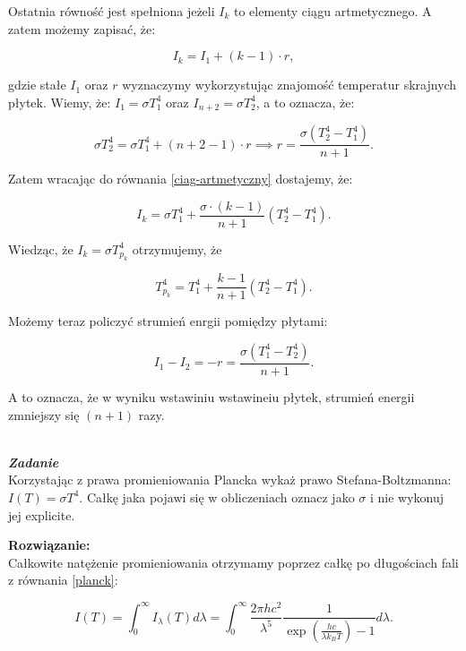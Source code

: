 \documentclass[11pt,a4paper]{article}
\newcounter{zadanie}\newcommand{\zadanie}[1][]{\addtocounter{zadanie}{1} ~\\  {\bf \emph{Zadanie \arabic{zadanie} #1 }} \\}
\begin{document}
Ostatnia równość jest spełniona jeżeli $I_{k}$ to elementy ciągu artmetycznego. A zatem możemy zapisać, że:

\begin{equation}
\label{ciag-artmetyczny}
I_{k} = I_{1} + (k-1) \cdot r,
\end{equation}

gdzie stałe $I_1$ oraz $r$ wyznaczymy wykorzystując znajomość temperatur skrajnych płytek. Wiemy, że: $I_1 = \sigma T_{1}^4$ oraz $I_{n+2} = \sigma T_{2}^{4}$, a to oznacza, że:

\begin{equation}
\sigma T_{2}^{4} = \sigma T^{4}_{1} + (n+2-1) \cdot r \implies r = \frac{\sigma (T_{2}^{4} - T_{1}^{4})}{n+1}.
\end{equation}

Zatem wracając do równania \eqref{ciag-artmetyczny} dostajemy, że:

\begin{equation}
I_{k} = \sigma T^{4}_{1} + \frac{\sigma \cdot (k-1)}{n+1}(T_{2}^{4}-T_{1}^{4}).
\end{equation}

Wiedząc, że $I_{k} = \sigma T_{p_{k}}^{4}$ otrzymujemy, że

\begin{equation}
T_{p_{k}}^{4} = T_{1}^{4} + \frac{k-1}{n+1}(T_{2}^{4}-T_{1}^{4}). 
\end{equation}

Możemy teraz policzyć strumień enrgii pomiędzy płytami:

\begin{equation}
I_{1} - I_{2} = -r = \frac{\sigma(T_{1}^{4}-T_{2}^{4})}{n+1}.
\end{equation}

A to oznacza, że w wyniku wstawiniu wstawineiu płytek, strumień energii zmniejszy się $(n+1)$ razy.

\newpage

\zadanie
Korzystając z prawa promieniowania Plancka wykaż prawo Stefana-Boltzmanna:  $I(T) = \sigma T^4$.
Całkę jaka pojawi się w obliczeniach oznacz jako $\sigma$ i nie wykonuj jej explicite.


\vskip 10pt
\textbf{Rozwiązanie:}\\
Całkowite natężenie promieniowania otrzymamy poprzez całkę po długościach fali z równania \eqref{planck}:

\begin{equation}
  I(T) = \int_0^\infty I_\lambda(T) d\lambda =
  \int_0^\infty \frac{2 \pi h c^2}{\lambda^5} \frac{1}{\exp\left(\frac{h c}{\lambda k_B T}\right)-1} d\lambda. \label{integral}
\end{equation}
\end{document}

